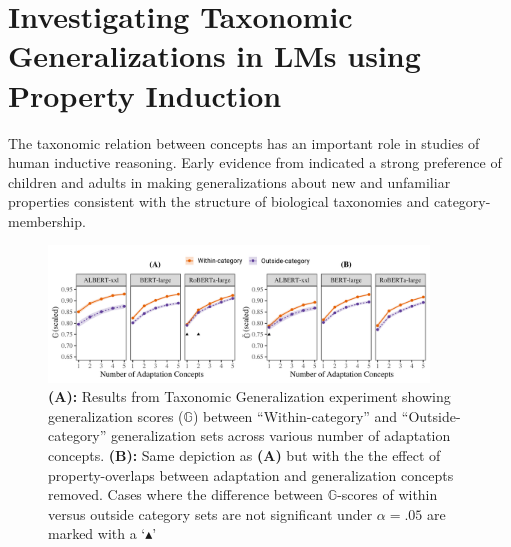 \documentclass[10pt,letterpaper]{article}
\begin{document}
\section{Investigating Taxonomic Generalizations in LMs using Property Induction}
The taxonomic relation between concepts has an important role in studies of human inductive reasoning.
Early evidence from \citet{gelman1986categories} indicated a strong preference of children and adults in making generalizations about new and unfamiliar properties consistent with the structure of biological taxonomies and category-membership.
\begin{figure}[h]
    \centering
    \includegraphics[width=0.9\textwidth]{withwithoutoverlaps.pdf}
    \caption{\textbf{(A):} Results from Taxonomic Generalization experiment showing generalization scores ($\mathbb{G}$) between ``Within-category'' and ``Outside-category'' generalization sets across various number of adaptation concepts. \textbf{(B):} Same depiction as \textbf{(A)} but with the the effect of property-overlaps between adaptation and generalization concepts removed. Cases where the difference between $\mathbb{G}$-scores of within versus outside category sets are not significant under $\alpha = .05$ are marked with a `$\blacktriangle$'}
    \label{fig:taxonomicresults}
\end{figure}
\end{document}
